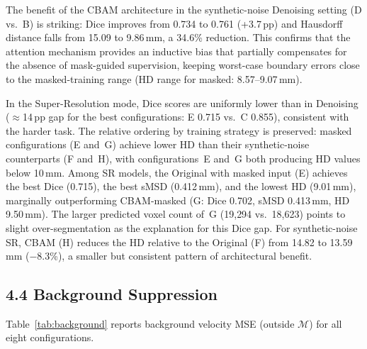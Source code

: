 The benefit of the CBAM architecture in the synthetic-noise Denoising setting (D vs.\ B) is
striking: Dice improves from 0.734 to 0.761 (+3.7\,pp) and Hausdorff distance falls from
15.09 to 9.86\,mm, a 34.6\% reduction.  This confirms that the attention mechanism provides an
inductive bias that partially compensates for the absence of mask-guided supervision, keeping
worst-case boundary errors close to the masked-training range (HD range for masked:
8.57--9.07\,mm).

In the Super-Resolution mode, Dice scores are uniformly lower than in Denoising ($\approx$14\,pp
gap for the best configurations: E 0.715 vs.\ C 0.855), consistent with the harder task.  The
relative ordering by training strategy is preserved: masked configurations (E and~G) achieve
lower HD than their synthetic-noise counterparts (F and~H), with configurations~E and~G both
producing HD values below 10\,mm.  Among SR models, the Original with masked input (E) achieves
the best Dice (0.715), the best sMSD (0.412\,mm), and the lowest HD (9.01\,mm), marginally
outperforming CBAM-masked (G: Dice 0.702, sMSD 0.413\,mm, HD 9.50\,mm).  The larger predicted
voxel count of~G (19{,}294 vs.\ 18{,}623) points to slight over-segmentation as the explanation
for this Dice gap.  For synthetic-noise SR, CBAM (H) reduces the HD relative to the Original (F)
from 14.82 to 13.59\,mm ($-$8.3\%), a smaller but consistent pattern of architectural benefit.

\subsection*{4.4 Background Suppression}

Table~\ref{tab:background} reports background velocity MSE (outside $\mathcal{M}$) for all eight
configurations.

